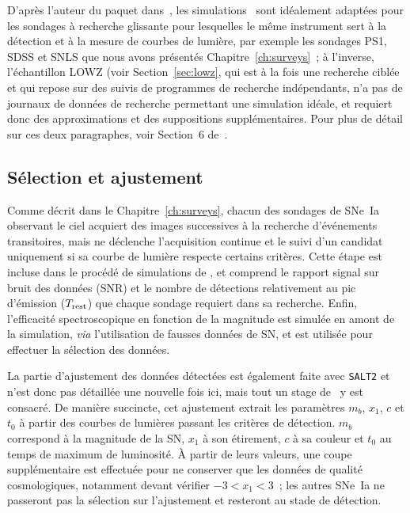 \documentclass[../main/main.tex]{subfiles}
\begin{document}
D'après l'auteur du paquet dans~\cite{kessler2019}, les simulations \snana\ sont
idéalement adaptées pour les sondages à recherche glissante pour lesquelles le
même instrument sert à la détection et à la mesure de courbes de lumière, par
exemple les sondages PS1, SDSS et SNLS que nous avons présentés
Chapitre~\ref{ch:surveys}~; à l'inverse, l'échantillon LOWZ (voir
Section~\ref{sec:lowz}, qui est à la fois une recherche ciblée et qui repose sur
des suivis de programmes de recherche indépendants, n'a pas de journaux de
données de recherche permettant une simulation idéale, et requiert donc des
approximations et des suppositions supplémentaires. Pour plus de détail sur ces
deux paragraphes, voir Section~6 de~\cite{kessler2019}.

\subsection{Sélection et ajustement}\label{ssec:simdetec}

Comme décrit dans le Chapitre~\ref{ch:surveys}, chacun des sondages de SNe~Ia
observant le ciel acquiert des images successives à la recherche d'événements
transitoires, mais ne déclenche l'acquisition continue et le suivi d'un candidat
uniquement si sa courbe de lumière respecte certains critères. Cette étape est
incluse dans le procédé de simulations de \snana, et comprend le rapport signal
sur bruit des données (SNR) et le nombre de détections relativement au pic
d'émission ($T_{\rm rest}$) que chaque sondage requiert dans sa recherche.
Enfin, l'efficacité spectroscopique en fonction de la magnitude est simulée en
amont de la simulation, \textit{via} l'utilisation de fausses données de SN, et
est utilisée pour effectuer la sélection des données.

La partie d'ajustement des données détectées est également faite avec
\texttt{SALT2} et n'est donc pas détaillée une nouvelle fois ici, mais tout un
stage de \snana\ y est consacré. De manière succincte, cet ajustement extrait
les paramètres $m_b$, $x_1$, $c$ et $t_0$ à partir des courbes de lumières
passant les critères de détection. $m_b$ correspond à la magnitude de la SN,
$x_1$ à son étirement, $c$ à sa couleur et $t_0$ au temps de maximum de
luminosité. À partir de leurs valeurs, une coupe supplémentaire est effectuée
pour ne conserver que les données de qualité cosmologiques, notamment devant
vérifier $-3 < x_1 < 3$~; les autres SNe~Ia ne passeront pas la sélection sur
l'ajustement et resteront au stade de détection.
\end{document}
